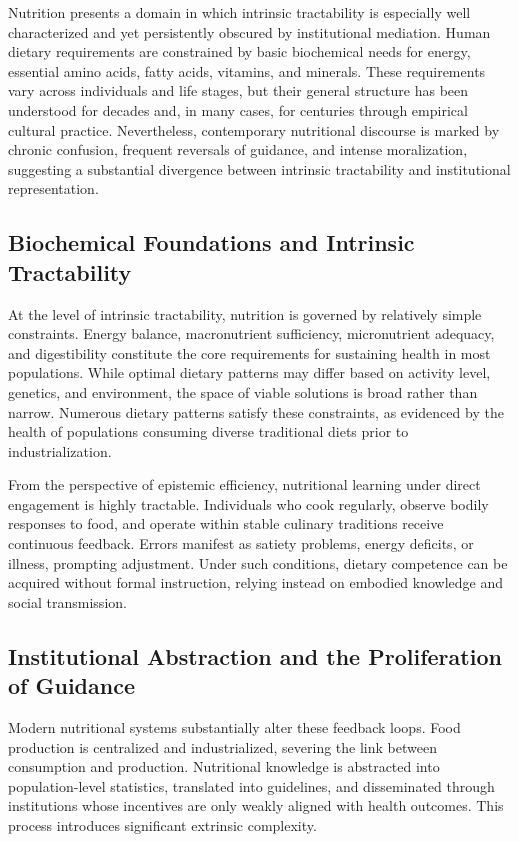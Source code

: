 \documentclass[11pt]{article}
\begin{document}
Nutrition presents a domain in which intrinsic tractability is especially well characterized and yet persistently obscured by institutional mediation. Human dietary requirements are constrained by basic biochemical needs for energy, essential amino acids, fatty acids, vitamins, and minerals. These requirements vary across individuals and life stages, but their general structure has been understood for decades and, in many cases, for centuries through empirical cultural practice. Nevertheless, contemporary nutritional discourse is marked by chronic confusion, frequent reversals of guidance, and intense moralization, suggesting a substantial divergence between intrinsic tractability and institutional representation.

\subsection{Biochemical Foundations and Intrinsic Tractability}

At the level of intrinsic tractability, nutrition is governed by relatively simple constraints. Energy balance, macronutrient sufficiency, micronutrient adequacy, and digestibility constitute the core requirements for sustaining health in most populations. While optimal dietary patterns may differ based on activity level, genetics, and environment, the space of viable solutions is broad rather than narrow. Numerous dietary patterns satisfy these constraints, as evidenced by the health of populations consuming diverse traditional diets prior to industrialization.

From the perspective of epistemic efficiency, nutritional learning under direct engagement is highly tractable. Individuals who cook regularly, observe bodily responses to food, and operate within stable culinary traditions receive continuous feedback. Errors manifest as satiety problems, energy deficits, or illness, prompting adjustment. Under such conditions, dietary competence can be acquired without formal instruction, relying instead on embodied knowledge and social transmission.

\subsection{Institutional Abstraction and the Proliferation of Guidance}

Modern nutritional systems substantially alter these feedback loops. Food production is centralized and industrialized, severing the link between consumption and production. Nutritional knowledge is abstracted into population-level statistics, translated into guidelines, and disseminated through institutions whose incentives are only weakly aligned with health outcomes. This process introduces significant extrinsic complexity.
\end{document}
